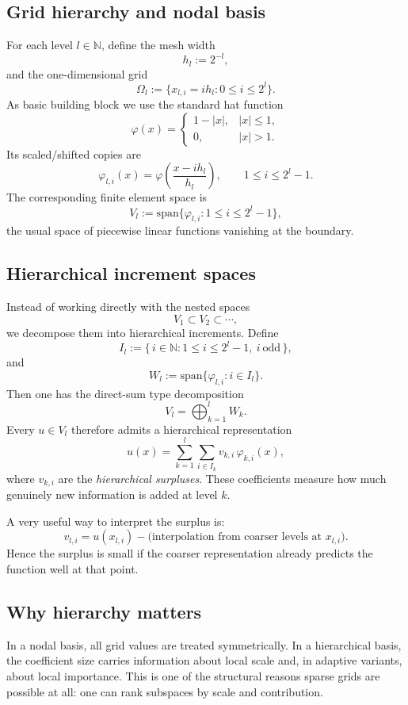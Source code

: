 \documentclass[11pt,a4paper]{report}
\begin{document}
\subsection{Grid hierarchy and nodal basis}

For each level $l\in\mathbb{N}$, define the mesh width
$$
h_l := 2^{-l},
$$
and the one-dimensional grid
$$
\Omega_l := \{x_{l,i}=i h_l : 0\le i\le 2^l\}.
$$
As basic building block we use the standard hat function
$$
\varphi(x)=
\begin{cases}
1-|x|, & |x|\le 1,\\
0, & |x|>1.
\end{cases}
$$
Its scaled/shifted copies are
$$
\varphi_{l,i}(x)
=
\varphi\!\left(\frac{x-i h_l}{h_l}\right),
\qquad 1\le i\le 2^l-1.
$$
The corresponding finite element space is
$$
V_l := \mathrm{span}\{\varphi_{l,i} : 1\le i\le 2^l-1\},
$$
the usual space of piecewise linear functions vanishing at the boundary.

\subsection{Hierarchical increment spaces}

Instead of working directly with the nested spaces
$$
V_1 \subset V_2 \subset \cdots,
$$
we decompose them into hierarchical increments. Define
$$
I_l := \{\, i\in\mathbb{N} : 1\le i\le 2^l-1,\ i\ \text{odd}\,\},
$$
and
$$
W_l := \mathrm{span}\{\varphi_{l,i}: i\in I_l\}.
$$
Then one has the direct-sum type decomposition
$$
V_l = \bigoplus_{k=1}^l W_k.
$$
Every $u\in V_l$ therefore admits a hierarchical representation
$$
u(x)=\sum_{k=1}^l \sum_{i\in I_k} v_{k,i}\,\varphi_{k,i}(x),
$$
where $v_{k,i}$ are the \emph{hierarchical surpluses}. These coefficients measure how much genuinely new information is added at level $k$.

A very useful way to interpret the surplus is:
$$
v_{l,i}
=
u(x_{l,i}) - \text{(interpolation from coarser levels at }x_{l,i}\text{)}.
$$
Hence the surplus is small if the coarser representation already predicts the function well at that point.

\subsection{Why hierarchy matters}

In a nodal basis, all grid values are treated symmetrically. In a hierarchical basis, the coefficient size carries information about local scale and, in adaptive variants, about local importance. This is one of the structural reasons sparse grids are possible at all: one can rank subspaces by scale and contribution.
\end{document}
